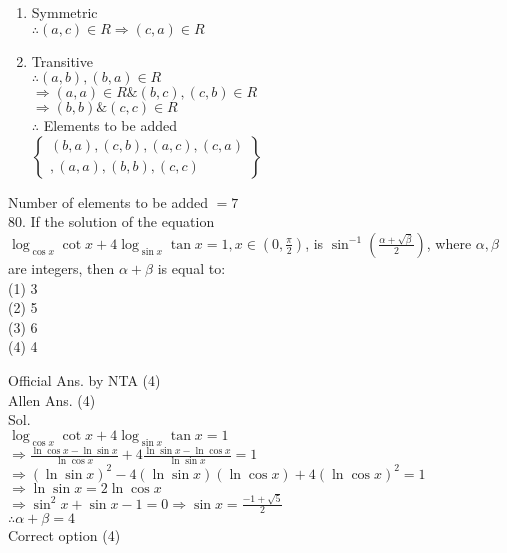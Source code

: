 \documentclass[10pt]{article}
\begin{document}
\begin{enumerate}
  \item Symmetric\\
\(\therefore(a, c) \in R \Rightarrow(c, a) \in R\)
  \item Transitive\\
\(\therefore(a, b),(b, a) \in R\)\\
\(\Rightarrow(a, a) \in R \&(b, c),(c, b) \in R\)\\
\(\Rightarrow(b, b) \&(c, c) \in R\)\\
\(\therefore\) Elements to be added\\
\(\left\{\begin{array}{r}(b, a),(c, b),(a, c),(c, a) \\ ,(a, a),(b, b),(c, c)\end{array}\right\}\)
\end{enumerate}

Number of elements to be added \(=7\)\\
80. If the solution of the equation \(\log _{\cos x} \cot x+4 \log _{\sin x} \tan x=1, x \in\left(0, \frac{\pi}{2}\right)\), is \(\sin ^{-1}\left(\frac{\alpha+\sqrt{\beta}}{2}\right)\), where \(\alpha, \beta\) are integers, then \(\alpha+\beta\) is equal to:\\
(1) 3\\
(2) 5\\
(3) 6\\
(4) 4

Official Ans. by NTA (4)\\
Allen Ans. (4)\\
Sol.\\
\(\log _{\cos x} \cot x+4 \log _{\sin x} \tan x=1\)\\
\(\Rightarrow \frac{\ln \cos x-\ln \sin x}{\ln \cos x}+4 \frac{\ln \sin x-\ln \cos x}{\ln \sin x}=1\)\\
\(\Rightarrow(\ln \sin x)^{2}-4(\ln \sin x)(\ln \cos x)+4(\ln \cos x)^{2}=1\)\\
\(\Rightarrow \ln \sin x=2 \ln \cos x\)\\
\(\Rightarrow \sin ^{2} x+\sin x-1=0 \Rightarrow \sin x=\frac{-1+\sqrt{5}}{2}\)\\
\(\therefore \alpha+\beta=4\)\\
Correct option (4)
\end{document}
